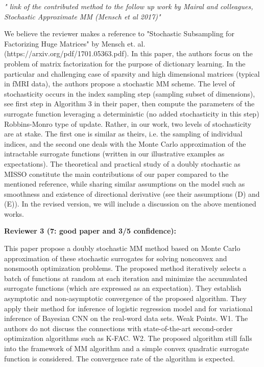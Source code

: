 \documentclass{article} %
\theoremstyle{t}
\begin{document}
\textit{" link of the contributed method to the follow up work by Mairal and colleagues, Stochastic Approximate MM (Mensch et al 2017)"}

We believe the reviewer makes a reference to "Stochastic Subsampling for Factorizing Huge Matrices" by Mensch et. al. (https://arxiv.org/pdf/1701.05363.pdf). In this paper, the authors focus on the problem of matrix factorization for the purpose of dictionary learning. In the particular and challenging case of sparsity and high dimensional matrices (typical in fMRI data), the authors propose a stochastic MM scheme. The level of stochasticity occurs in the index sampling step (sampling subset of dimensions), see first step in Algorithm 3 in their paper, then compute the parameters of the surrogate function leveraging a deterministic (no added stochasticity in this step) Robbins-Monro type of update.
Rather, in our work, two levels of stochasticity are at stake. The first one is similar as theirs, i.e. the sampling of individual indices, and the second one deals with the Monte Carlo approximation of the intractable surrogate functions (written in our illustrative examples as expectations). The theoretical and practical study of a doubly stochastic as MISSO constitute the main contributions of our paper compared to the mentioned reference, while sharing similar assumptions on the model such as smoothness and existence of directional derivative (see their assumptions (D) and (E)).
In the revised version, we will include a discussion on the above mentioned works. 




\textbf{Reviewer 3 (7: good paper and 3/5 confidence):}

This paper propose a doubly stochastic MM method based on Monte Carlo approximation of these stochastic surrogates for solving nonconvex and nonsmooth optimization problems. The proposed method iteratively selects a batch of functions at random at each iteration and minimize the accumulated surrogate functions (which are expressed as an expectation). They establish asymptotic and non-asymptotic convergence of the proposed algorithm. They apply their method for inference of logistic regression model and for variational inference of Bayesian CNN on the real-word data sets.
Weak Points. W1. The authors do not discuss the connections with state-of-the-art second-order optimization algorithms such as K-FAC. W2. The proposed algorithm still falls into the framework of MM algorithm and a simple convex quadratic surrogate function is considered. The convergence rate of the algorithm is expected.
\end{document}
